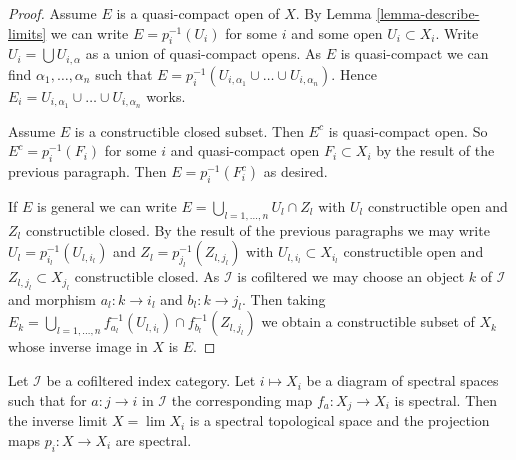 \begin{proof}
Assume $E$ is a quasi-compact open of $X$. By
Lemma \ref{lemma-describe-limits} we can write $E = p_i^{-1}(U_i)$
for some $i$ and some open $U_i \subset X_i$.
Write $U_i = \bigcup U_{i, \alpha}$ as a union of quasi-compact opens.
As $E$ is quasi-compact we can find $\alpha_1, \ldots, \alpha_n$
such that $E = p_i^{-1}(U_{i, \alpha_1} \cup \ldots \cup U_{i, \alpha_n})$.
Hence $E_i = U_{i, \alpha_1} \cup \ldots \cup U_{i, \alpha_n}$ works.

\medskip\noindent
Assume $E$ is a constructible closed subset. Then $E^c$ is quasi-compact
open. So $E^c = p_i^{-1}(F_i)$ for some $i$ and
quasi-compact open $F_i \subset X_i$ by the result of the previous paragraph.
Then $E = p_i^{-1}(F_i^c)$ as desired.

\medskip\noindent
If $E$ is general we can write $E = \bigcup_{l = 1, \ldots, n} U_l \cap Z_l$
with $U_l$ constructible open and $Z_l$ constructible closed. By the result
of the previous paragraphs we may write $U_l = p_{i_l}^{-1}(U_{l, i_l})$
and $Z_l = p_{j_l}^{-1}(Z_{l, j_l})$
with $U_{l, i_l} \subset X_{i_l}$ constructible open and
$Z_{l, j_l} \subset X_{j_l}$ constructible closed. As $\mathcal{I}$ is
cofiltered we may choose an object $k$ of $\mathcal{I}$ and morphism
$a_l : k \to i_l$ and $b_l : k \to j_l$. Then taking
$E_k = \bigcup_{l = 1, \ldots, n}
f_{a_l}^{-1}(U_{l, i_l}) \cap f_{b_l}^{-1}(Z_{l, j_l})$
we obtain a constructible subset of $X_k$ whose inverse image in $X$ is $E$.
\end{proof}

\begin{lemma}
\label{lemma-directed-inverse-limit-spectral-spaces}
Let $\mathcal{I}$ be a cofiltered index category.
Let $i \mapsto X_i$ be a diagram of spectral spaces such
that for $a : j \to i$ in $\mathcal{I}$ the corresponding map
$f_a : X_j \to X_i$ is spectral. Then
the inverse limit $X = \lim X_i$ is a spectral topological space
and the projection maps $p_i : X \to X_i$ are spectral.
\end{lemma}

